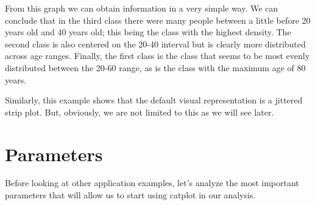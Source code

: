 \documentclass[10pt]{extarticle}
\begin{document}
From this graph we can obtain information in a very simple way. We can conclude that in the third class there were many people between a little before 20 years old and 40 years old; this being the class with the highest density. The second class is also centered on the 20-40 interval but is clearly more distributed across age ranges. Finally, the first class is the class that seems to be most evenly distributed between the 20-60 range, as is the class with the maximum age of 80 years.

Similarly, this example shows that the default visual representation is a jittered strip plot. But, obviously, we are not limited to this as we will see later.

\section{Parameters}


\noindent Before looking at other application examples, let's analyze the most important parameters that will allow us to start using catplot in our analysis.
\end{document}
